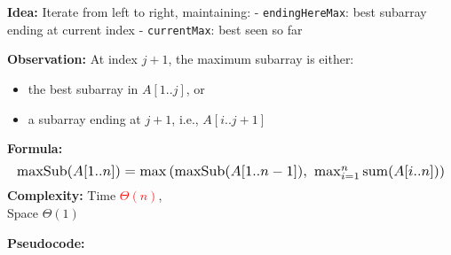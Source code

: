 \documentclass[a4paper,landscape]{article}
\newcommand{\timecomplexity}[1]{\textcolor{red}{#1}}
\begin{document}
\begin{multicols}{7}
\tcolorbox[mybox={Maximum Subarray Problem (Kadane's Algorithm)}]
\textbf{Idea:}
Iterate from left to right, maintaining:
- \texttt{endingHereMax}: best subarray ending at current index
- \texttt{currentMax}: best seen so far

\textbf{Observation:}
At index \( j+1 \), the maximum subarray is either:
\begin{itemize}[noitemsep,itemsep=0pt]
    \item the best subarray in \( A[1..j] \), or
    \item a subarray ending at \( j+1 \), i.e., \( A[i..j+1] \)
\end{itemize}
\textbf{Formula:}
\[
\resizebox{1\textwidth}{!}{$
    \text{maxSub}(A[1..n]) = \max\left(
    \text{maxSub}(A[1..n-1]),\ 
    \max_{i=1}^{n} \text{sum}(A[i..n])
    \right)
$}
\]
\textbf{Complexity:} Time \timecomplexity{\( \Theta(n) \)}, \\Space \( \Theta(1) \)

\textbf{Pseudocode:}


\end{multicols}
\end{document}
